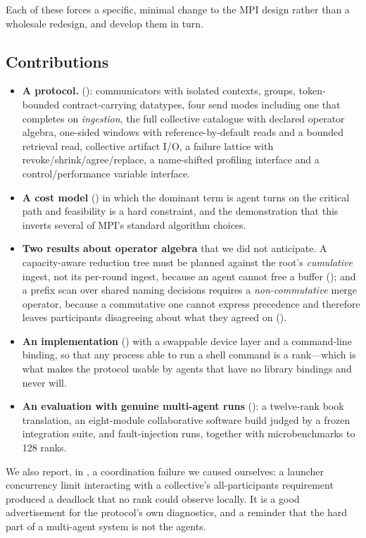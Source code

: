 Each of these forces a specific, minimal change to the MPI design rather
than a wholesale redesign, and  develop them
in turn.

\subsection{Contributions}

\begin{itemize}
\item \textbf{A protocol.} \ampi{} (): communicators with
isolated contexts, groups, token-bounded contract-carrying datatypes, four
send modes including one that completes on \emph{ingestion}, the full
collective catalogue with declared operator algebra, one-sided windows with
reference-by-default reads and a bounded retrieval read, collective
artifact I/O, a failure lattice with revoke/shrink/agree/replace, a
name-shifted profiling interface and a control/performance variable
interface.

\item \textbf{A cost model} () in which the dominant term is
agent turns on the critical path and feasibility is a hard constraint, and
the demonstration that this inverts several of MPI's standard algorithm
choices.

\item \textbf{Two results about operator algebra} that we did not
anticipate. A capacity-aware reduction tree must be planned against the
root's \emph{cumulative} ingest, not its per-round ingest, because an agent
cannot free a buffer (); and a prefix scan over shared naming
decisions requires a \emph{non-commutative} merge operator, because a
commutative one cannot express precedence and therefore leaves participants
disagreeing about what they agreed on ().

\item \textbf{An implementation} () with a swappable device
layer and a command-line binding, so that any process able to run a shell
command is a rank---which is what makes the protocol usable by agents that
have no library bindings and never will.

\item \textbf{An evaluation with genuine multi-agent runs}
(): a twelve-rank book translation, an eight-module
collaborative software build judged by a frozen integration suite, and
fault-injection runs, together with microbenchmarks to 128 ranks.
\end{itemize}

We also report, in , a coordination failure we caused
ourselves: a launcher concurrency limit interacting with a collective's
all-participants requirement produced a deadlock that no rank could observe
locally. It is a good advertisement for the protocol's own diagnostics, and
a reminder that the hard part of a multi-agent system is not the agents.
